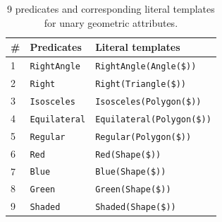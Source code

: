 \begin{table}[ht]
\footnotesize
\centering 
\begin{tabular}{lll}
	\toprule
	\# & \textbf{Predicates} & \textbf{Literal templates} \\
	\midrule
	1 & \texttt{RightAngle} & \texttt{RightAngle(Angle(\$))} \\
	2 & \texttt{Right} & \texttt{Right(Triangle(\$))} \\
	3 & \texttt{Isosceles} & \texttt{Isosceles(Polygon(\$))}\\
	4 & \texttt{Equilateral} & \texttt{Equilateral(Polygon(\$))}\\
	5 & \texttt{Regular} & \texttt{Regular(Polygon(\$))}\\
	6 & \texttt{Red} & \texttt{Red(Shape(\$))}\\
	7 & \texttt{Blue} & \texttt{Blue(Shape(\$))}\\
	8 & \texttt{Green} & \texttt{Green(Shape(\$))}\\
	9 & \texttt{Shaded} & \texttt{Shaded(Shape(\$))}\\
	\bottomrule
\end{tabular}
\caption{9 predicates and corresponding literal templates for unary geometric attributes.}
\label{appex:predicate2}
\end{table}



